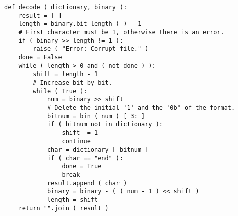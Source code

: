 \begin{lstlisting}
def decode ( dictionary, binary ):
    result = [ ]
    length = binary.bit_length ( ) - 1
    # First character must be 1, otherwise there is an error.
    if ( binary >> length != 1 ):
        raise ( "Error: Corrupt file." )
    done = False
    while ( length > 0 and ( not done ) ):
        shift = length - 1
        # Increase bit by bit.
        while ( True ):
            num = binary >> shift
            # Delete the initial '1' and the '0b' of the format.
            bitnum = bin ( num ) [ 3: ]
            if ( bitnum not in dictionary ):
                shift -= 1
                continue
            char = dictionary [ bitnum ]
            if ( char == "end" ):
                done = True
                break
            result.append ( char )
            binary = binary - ( ( num - 1 ) << shift )
            length = shift
    return "".join ( result )
\end{lstlisting}